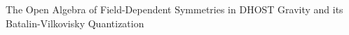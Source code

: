 \documentclass[twocolumn]{aastex631}
\begin{document}
The Open Algebra of Field-Dependent Symmetries in DHOST Gravity and its Batalin-Vilkovisky Quantization
\end{document}
